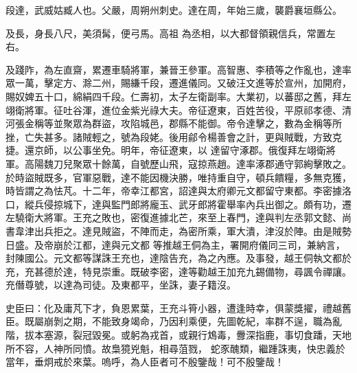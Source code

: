 \begin{pinyinscope}
 段達，武威姑臧人也。父嚴，周朔州刺史。達在周，年始三歲，襲爵襄垣縣公。



 及長，身長八尺，美須髯，便弓馬。高祖
 為丞相，以大都督領親信兵，常置左右。



 及踐阼，為左直齋，累遷車騎將軍，兼晉王參軍。高智惠、李積等之作亂也，達率眾一萬，擊定方、滁二州，賜縑千段，遷進儀同。又破汪文進等於宣州，加開府，賜奴婢五十口，綿絹四千段。仁壽初，太子左衛副率。大業初，以蕃邸之舊，拜左翊衛將軍。征吐谷渾，進位金紫光祿大夫。帝征遼東，百姓苦役，平原祁孝德、清河張金稱等並聚眾為群盜，攻陷城邑，郡縣不能御。帝令達擊之，數為金稱等所挫，亡失甚多。諸賊輕之，號為段姥。後用鄃令楊善會之計，更與賊戰，方致克捷。還京師，以公事坐免。明年，帝征遼東，以
 達留守涿郡。俄復拜左翊衛將軍。高陽魏刀兒聚眾十餘萬，自號歷山飛，寇掠燕趙。達率涿郡通守郭絢擊敗之。於時盜賊既多，官軍惡戰，達不能因機決勝，唯持重自守，頓兵饋糧，多無克獲，時皆謂之為怯芃。十二年，帝幸江都宮，詔達與太府卿元文都留守東都。李密據洛口，縱兵侵掠城下，達與監門郎將龐玉、武牙郎將霍舉率內兵出御之。頗有功，遷左驍衛大將軍。王充之敗也，密復進據北芒，來至上春門，達與判左丞郭文懿、尚書韋津出兵拒之。達見賊盜，不陣而走，為密所乘，軍大潰，津沒於陣。由是賊勢日盛。及帝崩於江都，達與元文都
 等推越王侗為主，署開府儀同三司，兼納言，封陳國公。元文都等謀誅王充也，達陰告充，為之內應。及事發，越王侗執文都於充，充甚德於達，特見崇重。既破李密，達等勸越王加充九錫備物，尋諷令禪讓。充僭尊號，以達為司徒。及東都平，坐誅，妻子籍沒。



 史臣曰：化及庸芃下才，負恩累葉，王充斗筲小器，遭逢時幸，俱蒙獎擢，禮越舊臣。既屬崩剝之期，不能致身竭命，乃因利乘便，先圖乾紀，率群不逞，職為亂階，拔本塞源，裂冠毀冕。或躬為戎首，或親行鴆毒，釁深指鹿，事切食蹯，天地所不容，人神所同憤。故梟獍兇魁，相尋菹戮，
 蛇豕醜類，繼踵誅夷，快忠義於當年，垂炯戒於來葉。嗚呼，為人臣者可不殷鑒哉！可不殷鑒哉！



\end{pinyinscope}